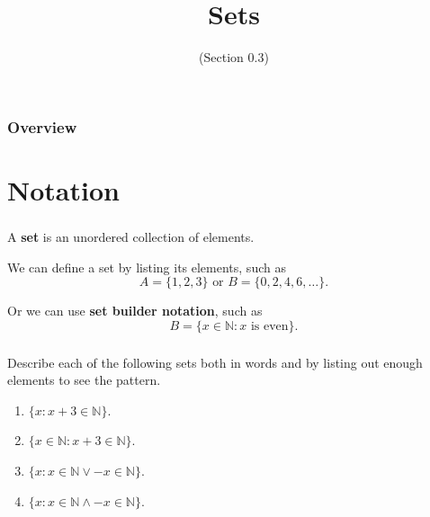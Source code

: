 \documentclass[11pt, compress]{beamer}
\title{Sets}
\subtitle{(Section 0.3)}
\author{}
\date{}
\newcommand{\terminology}[1]{\textbf{#1}}\newcommand{\lt}{<}
\newcommand{\N}{\mathbb N}
\newcommand{\st}{:}
\begin{document}
\begin{frame}
\maketitle 
\end{frame}
 
\begin{frame}
\frametitle{Overview}
\tableofcontents 
\end{frame}
 

\section{Notation}
\begin{frame}
\frametitle{}
A \terminology{set} is an unordered collection of elements.
 
\pause \vfill 

We can define a set by listing its elements, such as%
\begin{equation*}
A = \{1, 2, 3\} \text{ or } B = \{0, 2, 4, 6, \ldots\}.
\end{equation*}

 
\pause \vfill 

Or we can use \terminology{set builder notation}, such as%
\begin{equation*}
B = \{x \in \N \st x \text{ is even}\}.
\end{equation*}

\end{frame}
 
\begin{frame}
\frametitle{}
\begin{example}[0.3.1]Describe each of the following sets both in words and by listing out enough elements to see the pattern.
\begin{enumerate}
\item{} \(\{x \st x + 3 \in \N\}\).

\item{} \(\{x \in \N \st x + 3 \in \N\}\).

\item{} \(\{x \st x \in \N \vee -x \in \N\}\).

\item{} \(\{x \st x \in \N \wedge -x \in \N\}\).
\end{enumerate}

\end{example}
\end{frame}
 
\end{document}
